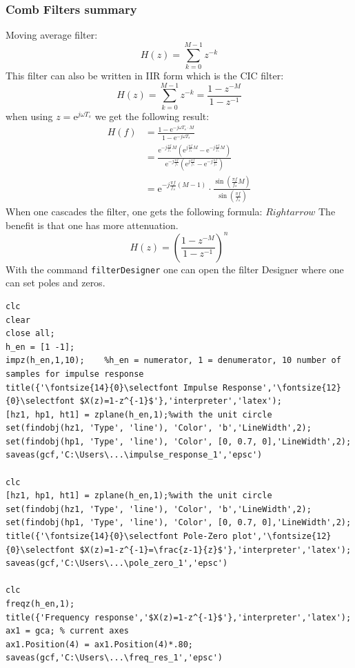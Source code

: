 \subsubsection{Comb Filters summary}
Moving average filter:
$$
H(z)=\sum_{k=0}^{M-1} z^{-k}
$$
This filter can also be written in IIR form which is the CIC filter:
$$
H(z)=\sum_{k=0}^{M-1} z^{-k}=\frac{1-z^{-M}}{1-z^{-1}}
$$
when using $z=\mathrm{e}^{j \omega T_s}$ we get the following result:
\begin{equation}\label{eq:CIC_filter_supression}
\begin{aligned}
H(f) &=\frac{1-\mathrm{e}^{-j \omega T_s \cdot M}}{1-\mathrm{e}^{-j \omega T_s}} \\
&=\frac{\mathrm{e}^{-j \frac{\pi f}{f_s} M}\left(\mathrm{e}^{j \frac{\pi f}{f_s} M}-\mathrm{e}^{-j \frac{\pi f}{f_s} M}\right)}{\mathrm{e}^{-j \frac{\pi f}{f_s}}\left(\mathrm{e}^{j \frac{\pi f}{f_s}}-\mathrm{e}^{-j \frac{\pi f}{f_s}}\right)} \\
&=\mathrm{e}^{-j \frac{\pi f}{f_s}(M-1)} \cdot \frac{\sin \left(\frac{\pi f}{f_s} M\right)}{\sin \left(\frac{\pi f}{f_s}\right)}
\end{aligned}
\end{equation}
When one cascades the filter, one gets the following formula: $Rightarrow$ The benefit is that one has more attenuation.
$$
H(z)=\left(\frac{1-z^{-M}}{1-z^{-1}}\right)^n
$$
With the command \texttt{filterDesigner} one can open the filter Designer where one can set poles and zeros.\newline
\begin{listing}[!ht]
\begin{verbatim}
clc
clear
close all;
h_en = [1 -1];
impz(h_en,1,10);    %h_en = numerator, 1 = denumerator, 10 number of samples for impulse response
title({'\fontsize{14}{0}\selectfont Impulse Response','\fontsize{12}{0}\selectfont $X(z)=1-z^{-1}$'},'interpreter','latex');
[hz1, hp1, ht1] = zplane(h_en,1);%with the unit circle
set(findobj(hz1, 'Type', 'line'), 'Color', 'b','LineWidth',2); 
set(findobj(hp1, 'Type', 'line'), 'Color', [0, 0.7, 0],'LineWidth',2);
saveas(gcf,'C:\Users\...\impulse_response_1','epsc')

clc
[hz1, hp1, ht1] = zplane(h_en,1);%with the unit circle
set(findobj(hz1, 'Type', 'line'), 'Color', 'b','LineWidth',2); 
set(findobj(hp1, 'Type', 'line'), 'Color', [0, 0.7, 0],'LineWidth',2);
title({'\fontsize{14}{0}\selectfont Pole-Zero plot','\fontsize{12}{0}\selectfont $X(z)=1-z^{-1}=\frac{z-1}{z}$'},'interpreter','latex');
saveas(gcf,'C:\Users\...\pole_zero_1','epsc')

clc
freqz(h_en,1);
title({'Frequency response','$X(z)=1-z^{-1}$'},'interpreter','latex');
ax1 = gca; % current axes
ax1.Position(4) = ax1.Position(4)*.80; 
saveas(gcf,'C:\Users\...\freq_res_1','epsc')
\end{verbatim}
\end{listing}
